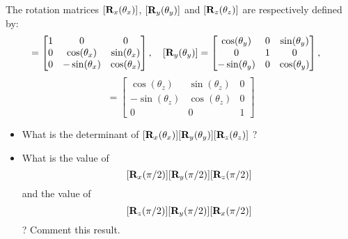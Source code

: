 \bexo
The rotation matrices $[\textbf{R}_x(\theta_x)]$, $[\textbf{R}_y(\theta_y)]$ and $[\textbf{R}_z(\theta_z)]$
are respectively defined by:
\begin{equation}
	[\tb{R}_x(\theta_x)]=\begin{bmatrix}
		1&0&0\\
		0 & \cos(\theta_x) &\sin(\theta_x)\\
		0 & -\sin(\theta_x) &\cos(\theta_x) 
	\end{bmatrix}\esp 
	[\tb{R}_y(\theta_y)]=\begin{bmatrix}
	\cos(\theta_y) &0&\sin(\theta_y)\\
0&1&0\\
-\sin(\theta_y)&0&\cos(\theta_y) 
	\end{bmatrix}
	\esp 
\end{equation}
\begin{equation}
[\tb{R}_z(\theta_z)]=\begin{bmatrix}
		\cos(\theta_z) &\sin(\theta_z)&0\\
		-\sin(\theta_z) &\cos(\theta_z)& 0\\
		0&0&1 
	\end{bmatrix}
\end{equation}

\begin{itemize}
	\item What is the determinant of $[\textbf{R}_x(\theta_x)][\textbf{R}_y(\theta_y)][\textbf{R}_z(\theta_z)]$ ?
	\item What is the value of $$[\textbf{R}_x(\pi/2)][\textbf{R}_y(\pi/2)][\textbf{R}_z(\pi/2)]$$and the value of $$[\textbf{R}_z(\pi/2)][\textbf{R}_y(\pi/2)][\textbf{R}_x(\pi/2)]$$ ? Comment this result.
\end{itemize}






\eexo 

\solution{}
	




